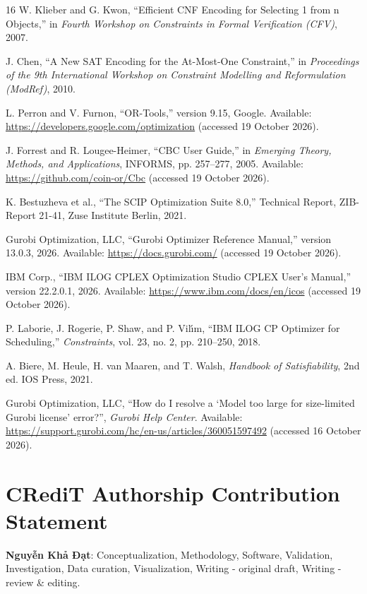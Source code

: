 \documentclass[a4paper,fleqn]{cas-sc}
\begin{document}
\begin{thebibliography}{16}
W. Klieber and G. Kwon, ``Efficient CNF Encoding for Selecting 1 from n Objects,'' in \emph{Fourth Workshop on Constraints in Formal Verification (CFV)}, 2007.

J. Chen, ``A New SAT Encoding for the At-Most-One Constraint,'' in \emph{Proceedings of the 9th International Workshop on Constraint Modelling and Reformulation (ModRef)}, 2010.

L. Perron and V. Furnon, ``OR-Tools,'' version 9.15, Google. Available: \url{https://developers.google.com/optimization} (accessed 19 October 2026).

J. Forrest and R. Lougee-Heimer, ``CBC User Guide,'' in \emph{Emerging Theory, Methods, and Applications}, INFORMS, pp. 257--277, 2005. Available: \url{https://github.com/coin-or/Cbc} (accessed 19 October 2026).

K. Bestuzheva et al., ``The SCIP Optimization Suite 8.0,'' Technical Report, ZIB-Report 21-41, Zuse Institute Berlin, 2021.

Gurobi Optimization, LLC, ``Gurobi Optimizer Reference Manual,'' version 13.0.3, 2026. Available: \url{https://docs.gurobi.com/} (accessed 19 October 2026).

IBM Corp., ``IBM ILOG CPLEX Optimization Studio CPLEX User's Manual,'' version 22.2.0.1, 2026. Available: \url{https://www.ibm.com/docs/en/icos} (accessed 19 October 2026).

P. Laborie, J. Rogerie, P. Shaw, and P. Vil\'{\i}m, ``IBM ILOG CP Optimizer for Scheduling,'' \emph{Constraints}, vol. 23, no. 2, pp. 210--250, 2018.

A. Biere, M. Heule, H. van Maaren, and T. Walsh, \emph{Handbook of Satisfiability}, 2nd ed. IOS Press, 2021.

Gurobi Optimization, LLC, ``How do I resolve a `Model too large for size-limited Gurobi license' error?'', \emph{Gurobi Help Center}. Available: \url{https://support.gurobi.com/hc/en-us/articles/360051597492} (accessed 16 October 2026).
\end{thebibliography}

\section*{CRediT Authorship Contribution Statement}
\textbf{Nguyễn Khả Đạt}: Conceptualization, Methodology, Software, Validation, Investigation, Data curation, Visualization, Writing - original draft, Writing - review \& editing.
\end{document}
